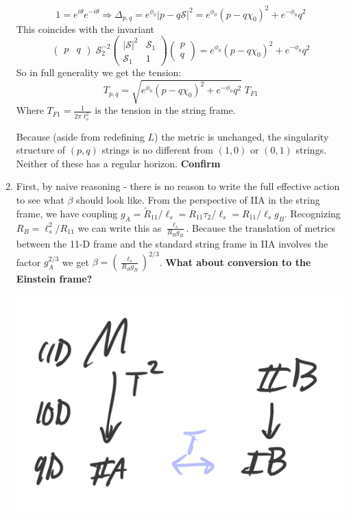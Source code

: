 \documentclass[11pt, class=article, crop=false]{standalone}
\begin{document}
\begin{enumerate}
	\[
		1 = e^{i \theta} e^{-i\theta} \Rightarrow \Delta_{p,q} = e^{\phi_0} |p - q \mathcal S|^2 = e^{\phi_0} (p-q \chi_0)^2 + e^{-\phi_0} q^2
	\]
	This coincides with the invariant
	\[
		\begin{pmatrix}
			p & q
		\end{pmatrix} \;
		\mathcal S_2^{-2}
		\begin{pmatrix}
			|\mathcal S|^2 & \mathcal S_1\\
			\mathcal S_1 & 1
		\end{pmatrix}\begin{pmatrix}
			p \\ q
		\end{pmatrix}  = e^{\phi_0} (p - q \chi_0)^2 + e^{-\phi_0} q^2
	\]
	So in full generality we get the tension:
	\[
		T_{p,q} = \sqrt{e^{\phi_0} (p - q \chi_0)^2 + e^{-\phi_0} q^2} \; T_{F1}
	\]
	Where $T_{F1} = \frac{1}{2 \pi \ell_s^2}$ is the tension in the string frame. 
	
	Because (aside from redefining $L$) the metric is unchanged, the singularity structure of $(p,q)$ strings is no different from $(1,0)$ or $(0,1)$ strings. Neither of these has a regular horizon. \textbf{Confirm}
	
	
	\item First, by naive reasoning - there is no reason to write the full effective action to see what $\beta$ should look like. From the perspective of IIA in the string frame, we have coupling $g_A = \tilde R_{11}/\ell_s = R_{11} \tau_2/ \ell_s = R_{11}/\ell_{s} g_B$. Recognizing $R_B = \ell_s^2/R_11$ we can write this as $\frac{\ell_s}{R_B g_B}$. Because the translation of metrics between the 11-D frame and the standard string frame in IIA involves the factor $g_A^{2/3}$ we get $\beta = \left(\frac{\ell_s}{R_B g_B} \right)^{2/3}$. \textbf{What about conversion to the Einstein frame?}
	
	\begin{center}
		\includegraphics[scale=0.13]{"Drawings/M IIB"}
	\end{center}
	

\end{enumerate}
\end{document}
